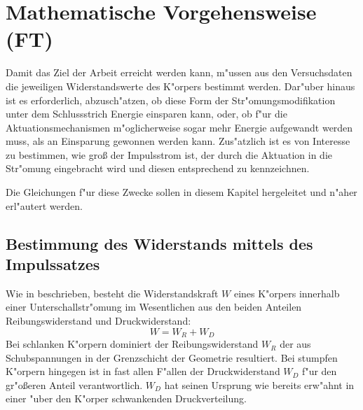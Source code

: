 \chapter{Mathematische Vorgehensweise (FT)}\label{s:widerstandsbestimmung}



Damit das Ziel der Arbeit erreicht werden kann, m"ussen aus den Versuchsdaten die jeweiligen Widerstandswerte des K"orpers bestimmt werden. Dar"uber hinaus ist es erforderlich, abzusch"atzen, ob diese Form der Str"omungsmodifikation unter dem Schlussstrich Energie einsparen kann, oder, ob f"ur die Aktuationsmechanismen m"oglicherweise sogar mehr Energie aufgewandt werden muss, als an Einsparung gewonnen werden kann.
Zus"atzlich ist es von Interesse zu bestimmen, wie gro\ss{} der Impulsstrom ist, der durch die Aktuation in die Str"omung eingebracht wird und diesen entsprechend zu kennzeichnen. 

Die Gleichungen f"ur diese Zwecke sollen in diesem Kapitel hergeleitet und n"aher erl"autert werden.

\section{Bestimmung des Widerstands mittels des Impulssatzes}
\label{sec:WueberImpulssatz}
Wie in  beschrieben, besteht die Widerstandskraft $W$ eines K"orpers innerhalb einer Unterschallstr"omung im Wesentlichen aus den beiden Anteilen Reibungswiderstand und Druckwiderstand:
	\begin{equation}
	\label{eq:W_zusammensetzung}
	W = W_R + W_D
	\end{equation}
Bei schlanken K"orpern dominiert der Reibungswiderstand $W_R$ der aus Schubspannungen in der Grenzschicht der Geometrie resultiert. Bei stumpfen K"orpern hingegen ist in fast allen F"allen der Druckwiderstand $W_D$ f"ur den gr"o\ss{}eren Anteil verantwortlich. $W_D$ hat seinen Ursprung wie bereits erw"ahnt in einer "uber den K"orper schwankenden Druckverteilung.  

